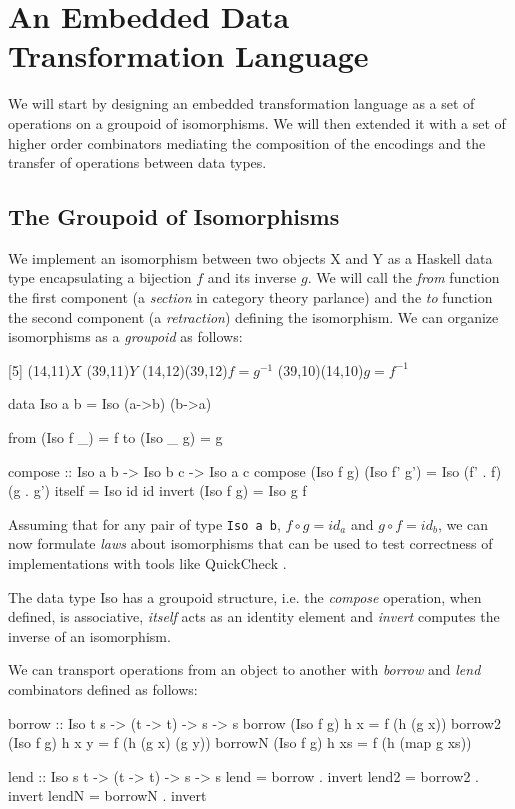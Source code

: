\documentclass[]{INCLUDES/llncs}
\begin{document}
\section{An Embedded Data Transformation Language}

We will start by designing an embedded transformation language
as a set of operations on a groupoid of isomorphisms. We will then
extended it with a set of higher order combinators mediating the
composition of the encodings and the transfer of operations between 
data types.

\subsection{The Groupoid of Isomorphisms}

We implement an isomorphism between two objects X and Y as a 
Haskell data type encapsulating a bijection $f$ and its inverse $g$. 
We will call the {\em from} function the first component (a {\em
section} in category theory parlance) and
the {\em to} function the second component (a {\em retraction}) defining
the isomorphism.
We can organize isomorphisms as a {\em groupoid} as follows:

\begindc{\commdiag}[5]
\obj(14,11){$X$}
\obj(39,11){$Y$}
\mor(14,12)(39,12){$f=g^{-1}$}
\mor(39,10)(14,10){$g=f^{-1}$}
\enddc

\begin{code}
data Iso a b = Iso (a->b) (b->a)

from (Iso f _) = f
to (Iso _ g) = g

compose :: Iso a b -> Iso b c -> Iso a c
compose (Iso f g) (Iso f' g') = Iso (f' . f) (g . g')
itself = Iso id id
invert (Iso f g) = Iso g f
\end{code}
Assuming that for any pair of type {\tt Iso a b},  $f \circ g = id_a$ and $g
\circ f=id_b$, we can now formulate {\em laws} about isomorphisms
that can be used to test correctness of implementations with tools like
QuickCheck \cite{DBLP:journals/sigplan/ClaessenH02}.
\begin{prop} 
The data type Iso has a groupoid structure, i.e. the {\em compose} operation,
when defined, is associative, {\em itself} acts as an identity element
and {\em invert} computes the inverse of an isomorphism.
\end{prop}


We can transport operations from an object to another
with {\em borrow} and {\em lend} combinators defined as follows:

\begin{code}
borrow :: Iso t s -> (t -> t) -> s -> s
borrow (Iso f g) h x = f (h (g x))
borrow2 (Iso f g) h x y = f (h (g x) (g y))
borrowN (Iso f g) h xs = f (h (map g xs))

lend :: Iso s t -> (t -> t) -> s -> s
lend = borrow . invert
lend2 = borrow2 . invert
lendN = borrowN . invert
\end{code}
\end{document}
